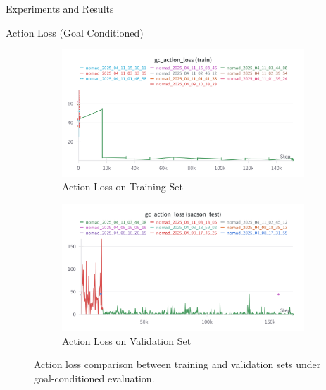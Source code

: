 \documentclass{beamer}
\begin{document}
\begin{frame}{Experiments and Results}
    \begin{block}{Action Loss (Goal Conditioned)}
        \begin{figure}[H]
            \centering
            \begin{subfigure}[b]{0.48\textwidth}
                \centering
                \includegraphics[width=\textwidth]{images/gc_actionloss_nomad.png}
                \caption{Action Loss on Training Set}
                \label{fig:gc_action_loss_train}
            \end{subfigure}
            \hfill
            \begin{subfigure}[b]{0.48\textwidth}
                \centering
                \includegraphics[width=\textwidth]{images/gc_actionloss_test_nomad.png}
                \caption{Action Loss on Validation Set}
                \label{fig:gc_action_loss_val}
            \end{subfigure}
            \caption{Action loss comparison between training and validation sets under goal-conditioned evaluation.}
        \end{figure}
    \end{block}
    \end{frame}
\end{document}

